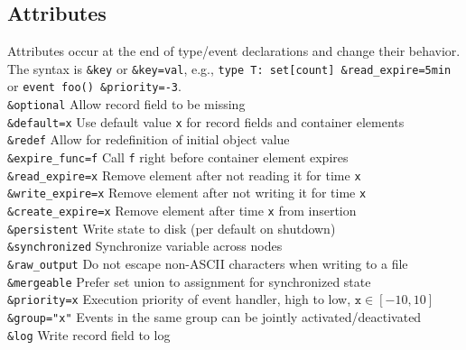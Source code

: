 \documentclass[10pt,landscape]{article}
\begin{document}
\begin{multicols*}{2}
\subsection*{Attributes}
Attributes occur at the end of type/event declarations and change their
behavior. The syntax is \verb|&key| or \verb|&key=val|, e.g.,
\verb|type T: set[count] &read_expire=5min| or
\verb|event foo() &priority=-3|.\\

\verb|&optional| \dotfill Allow record field to be missing\\
\verb|&default=x| \dotfill Use default value \texttt{x} for record fields and
  container elements\\
\verb|&redef| \dotfill Allow for redefinition of initial object value\\
%
\verb|&expire_func=f| \dotfill Call \verb|f| right before container element
  expires\\
\verb|&read_expire=x| \dotfill Remove element after not reading it for time
  \verb|x|\\
\verb|&write_expire=x| \dotfill Remove element after not writing it for time
  \verb|x|\\
\verb|&create_expire=x| \dotfill Remove element after time \verb|x| from
  insertion\\
\verb|&persistent| \dotfill Write state to disk (per default on shutdown)\\
\verb|&synchronized| \dotfill Synchronize variable across nodes\\
\verb|&raw_output| \dotfill Do not escape non-ASCII characters when writing to
  a file\\
\verb|&mergeable| \dotfill Prefer set union to assignment for synchronized
  state\\
\verb|&priority=x| \dotfill Execution priority of event handler, high to low, $\mathtt{x} \in [-10,10]$\\
\verb|&group="x"| \dotfill Events in the same group can be jointly
  activated/deactivated\\
\verb|&log| \dotfill Write record field to log \\


\end{multicols*}
\end{document}
